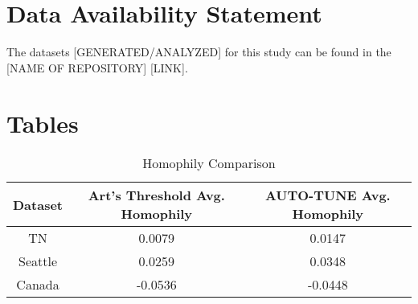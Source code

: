 \documentclass[utf8]{FrontiersinHarvard} %
\begin{document}
\section*{Data Availability Statement}
The datasets [GENERATED/ANALYZED] for this study can be found in the [NAME OF REPOSITORY] [LINK].


\nocite{*}



\section*{Tables}
\begin{table}[h]
\caption{Homophily Comparison}
\vspace{10pt}
\centering
\label{tab:homophily}
\begin{tabular}{|c|c|c|}
\hline
Dataset & Art's Threshold Avg. Homophily & AUTO-TUNE Avg. Homophily \\
\hline
TN & 0.0079 & 0.0147 \\
Seattle & 0.0259 & 0.0348 \\
Canada & -0.0536 & -0.0448 \\
\hline
\end{tabular}
\end{table}
\end{document}
